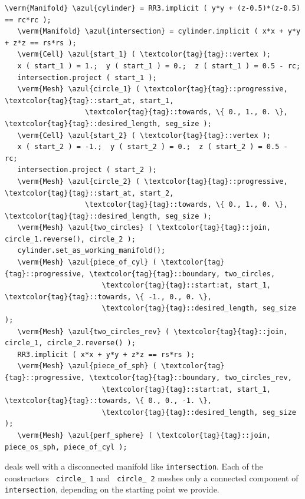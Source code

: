 \begin{Verbatim}[commandchars=\\\{\},formatcom=\small\tt,frame=single,
   label=parag-\ref{\numb section 3.\numb parag 19}.cpp,rulecolor=\color{coment},
   baselinestretch=0.94,framesep=2mm                                            ]
   \verm{Manifold} \azul{cylinder} = RR3.implicit ( y*y + (z-0.5)*(z-0.5) == rc*rc );
   \verm{Manifold} \azul{intersection} = cylinder.implicit ( x*x + y*y + z*z == rs*rs );
   \verm{Cell} \azul{start_1} ( \textcolor{tag}{tag}::vertex );
   x ( start_1 ) = 1.;  y ( start_1 ) = 0.;  z ( start_1 ) = 0.5 - rc;
   intersection.project ( start_1 );
   \verm{Mesh} \azul{circle_1} ( \textcolor{tag}{tag}::progressive, \textcolor{tag}{tag}::start_at, start_1,
                   \textcolor{tag}{tag}::towards, \{ 0., 1., 0. \}, \textcolor{tag}{tag}::desired_length, seg_size );
   \verm{Cell} \azul{start_2} ( \textcolor{tag}{tag}::vertex );
   x ( start_2 ) = -1.;  y ( start_2 ) = 0.;  z ( start_2 ) = 0.5 - rc;
   intersection.project ( start_2 );
   \verm{Mesh} \azul{circle_2} ( \textcolor{tag}{tag}::progressive, \textcolor{tag}{tag}::start_at, start_2,
                   \textcolor{tag}{tag}::towards, \{ 0., 1., 0. \}, \textcolor{tag}{tag}::desired_length, seg_size );
   \verm{Mesh} \azul{two_circles} ( \textcolor{tag}{tag}::join, circle_1.reverse(), circle_2 );
   cylinder.set_as_working_manifold();
   \verm{Mesh} \azul{piece_of_cyl} ( \textcolor{tag}{tag}::progressive, \textcolor{tag}{tag}::boundary, two_circles,
                       \textcolor{tag}{tag}::start:at, start_1, \textcolor{tag}{tag}::towards, \{ -1., 0., 0. \},
                       \textcolor{tag}{tag}::desired_length, seg_size                         );
   \verm{Mesh} \azul{two_circles_rev} ( \textcolor{tag}{tag}::join, circle_1, circle_2.reverse() );
   RR3.implicit ( x*x + y*y + z*z == rs*rs );
   \verm{Mesh} \azul{piece_of_sph} ( \textcolor{tag}{tag}::progressive, \textcolor{tag}{tag}::boundary, two_circles_rev,
                       \textcolor{tag}{tag}::start:at, start_1, \textcolor{tag}{tag}::towards, \{ 0., 0., -1. \},
                       \textcolor{tag}{tag}::desired_length, seg_size                         );
   \verm{Mesh} \azul{perf_sphere} ( \textcolor{tag}{tag}::join, piece_os_sph, piece_of_cyl );
\end{Verbatim}

{\ManiFEM} deals well with a disconnected manifold like {\small\tt intersection}.
Each of the constructors {\small\tt {} circle\_\,1} and {\small\tt {} circle\_\,2} meshes only
a connected component of {\small\tt intersection}, depending on the starting point we provide.

